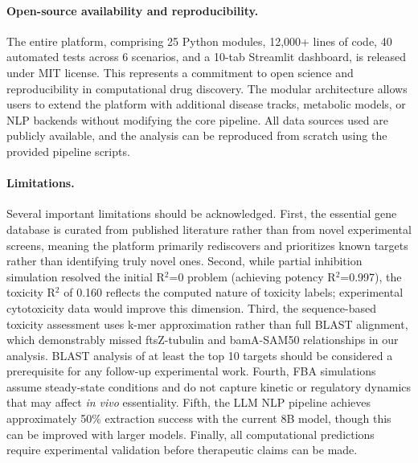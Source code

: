\documentclass[12pt,a4paper]{article}
\begin{document}
\paragraph{Open-source availability and reproducibility.}
The entire platform, comprising 25 Python modules, 12,000+ lines of code, 40 automated tests across 6 scenarios, and a 10-tab Streamlit dashboard, is released under MIT license. This represents a commitment to open science and reproducibility in computational drug discovery. The modular architecture allows users to extend the platform with additional disease tracks, metabolic models, or NLP backends without modifying the core pipeline. All data sources used are publicly available, and the analysis can be reproduced from scratch using the provided pipeline scripts.

\paragraph{Limitations.}
Several important limitations should be acknowledged. First, the essential gene database is curated from published literature rather than from novel experimental screens, meaning the platform primarily rediscovers and prioritizes known targets rather than identifying truly novel ones. Second, while partial inhibition simulation resolved the initial R$^2$=0 problem (achieving potency R$^2$=0.997), the toxicity R$^2$ of 0.160 reflects the computed nature of toxicity labels; experimental cytotoxicity data would improve this dimension. Third, the sequence-based toxicity assessment uses k-mer approximation rather than full BLAST alignment, which demonstrably missed ftsZ-tubulin and bamA-SAM50 relationships in our analysis. BLAST analysis of at least the top 10 targets should be considered a prerequisite for any follow-up experimental work. Fourth, FBA simulations assume steady-state conditions and do not capture kinetic or regulatory dynamics that may affect \textit{in vivo} essentiality. Fifth, the LLM NLP pipeline achieves approximately 50\% extraction success with the current 8B model, though this can be improved with larger models. Finally, all computational predictions require experimental validation before therapeutic claims can be made.
\end{document}
